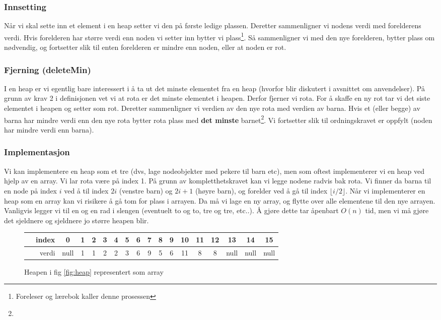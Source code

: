 \subsubsection{Innsetting}
Når vi skal sette inn et element i en heap setter vi den på første ledige plassen. Deretter sammenligner vi nodens verdi med forelderens verdi. Hvis forelderen har større verdi enn noden vi setter inn bytter vi plass\footnote{Foreleser og lærebok kaller denne prosessen }. Så sammenligner vi med den nye forelderen, bytter plass om nødvendig, og fortsetter slik til enten forelderen er mindre enn noden, eller at noden er rot. 

\subsubsection{Fjerning (deleteMin)}
I en heap er vi egentlig bare interessert i å ta ut det minste elementet fra en heap (hvorfor blir diskutert i avsnittet om anvendelser). På grunn av krav 2 i definisjonen vet vi at rota er det minste elementet i heapen. Derfor fjerner vi rota. For å skaffe en ny rot tar vi det siste elementet i heapen og setter som rot. Deretter sammenligner vi verdien av den nye rota med verdien av barna. Hvis et (eller begge) av barna har mindre verdi enn den nye rota bytter rota plass med \textbf{det minste} barnet\footnote{}. Vi fortsetter slik til ordningskravet er oppfylt (noden har mindre verdi enn barna). 

\subsubsection{Implementasjon}
Vi kan implementere en heap som et tre (dvs, lage nodeobjekter med pekere til barn etc), men som oftest implementerer vi en heap ved hjelp av en array. Vi lar rota være på index 1. På grunn av kompletthetskravet kan vi legge nodene radvis bak rota. Vi finner da barna til en node på index $ i $ ved å til index $ 2i $ (venstre barn) og $ 2i+1 $ (høyre barn), og forelder ved å gå til index $ \lfloor i/2 \rfloor $. Når vi implementerer en heap som en array kan vi risikere å gå tom for plass i arrayen. Da må vi lage en ny array, og flytte over alle elementene til den nye arrayen. Vanligvis legger vi til en og en rad i slengen (eventuelt to og to, tre og tre, etc..). Å gjøre dette tar åpenbart $ O(n) $ tid, men vi må gjøre det sjeldnere og sjeldnere jo større heapen blir. 

\begin{figure}[H]
\centering
\caption{Heapen i fig \ref{fig:heap} representert som array}
\begin{tabular}{r||c|c|c|c|c|c|c|c|c|c|c|c|c|c|c|c}
	~~index &  0   & 1 & 2 & 3 & 4 & 5 & 6 & 7 & 8 & 9 & 10 & 11 & 12 &  13  &  14  &  15  \\ \hline
	~~verdi & null & 1 & 1 & 2 & 2 & 3 & 6 & 9 & 5 & 6 & 11 & 8  & 8  & null & null & null 
\end{tabular}
\end{figure}

